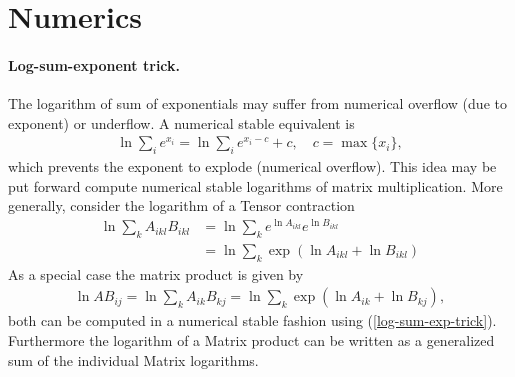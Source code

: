 \documentclass[12pt,a4paper]{article}
\begin{document}
\appendix
\section{Numerics}
\paragraph{Log-sum-exponent trick.} The logarithm of sum of exponentials may suffer from numerical overflow (due to exponent) or underflow. A numerical stable equivalent is
\begin{align} \label{log-sum-exp-trick}
	\ln \sum_i e^{x_i}  =  \ln \sum_i e^{x_i - c} + c, \quad c = \max\{x_i\}, 
\end{align}
which prevents the exponent to explode (numerical overflow). This idea may be put forward compute numerical stable logarithms of matrix multiplication. 
More generally, consider the logarithm of a Tensor contraction  
\begin{align}
\ln \sum_k A_{ikl} B_{ikl} &= \ln \sum_k e^{\ln A_{ikl}} e^{\ln B_{ikl}} \\
& = \ln \sum_k \exp({\ln A_{ikl} + \ln B_{ikl}}) 
\end{align}
As a special case the matrix product is given by
\begin{align}
\ln A B_{ij} = \ln \sum_k A_{ik} B_{kj} = \ln \sum_k \exp({\ln A_{ik} + \ln B_{kj}}),  
\end{align}
both can be computed in a numerical stable fashion using (\ref{log-sum-exp-trick}). Furthermore the logarithm of a Matrix product can be written as a generalized sum of the individual Matrix logarithms.




\end{document}
